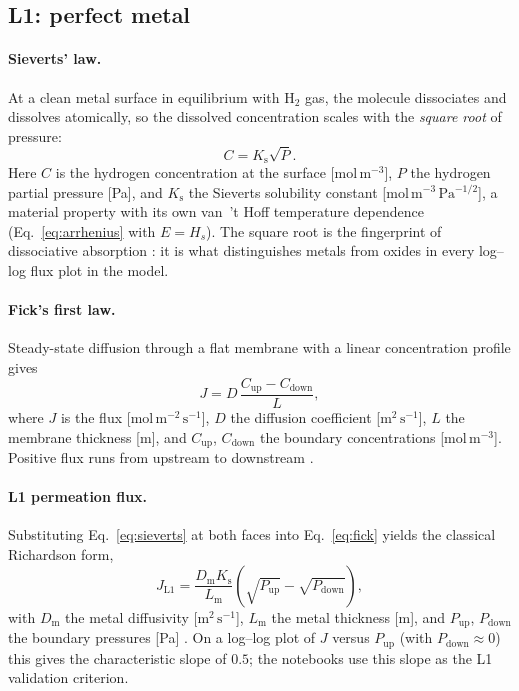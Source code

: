 \documentclass[11pt,a4paper]{article}
\newcommand{\Pup}{P_{\mathrm{up}}}
\newcommand{\Pdown}{P_{\mathrm{down}}}
\newcommand{\Ks}{K_{\mathrm{s}}}
\newcommand{\Dm}{D_{\mathrm{m}}}
\newcommand{\Lm}{L_{\mathrm{m}}}
\begin{document}
\subsection{L1: perfect metal}

\paragraph{Sieverts' law.} At a clean metal surface in equilibrium with
$\mathrm{H_2}$ gas, the molecule dissociates and dissolves atomically, so the
dissolved concentration scales with the \emph{square root} of pressure:
\begin{equation}
  C = \Ks \sqrt{P}.
  \label{eq:sieverts}
\end{equation}
Here $C$ is the hydrogen concentration at the surface
[$\mathrm{mol\,m^{-3}}$], $P$ the hydrogen partial pressure [Pa], and $\Ks$
the Sieverts solubility constant [$\mathrm{mol\,m^{-3}\,Pa^{-1/2}}$], a
material property with its own van~'t Hoff temperature dependence
(Eq.~\eqref{eq:arrhenius} with $E = H_s$). The square root is the fingerprint
of dissociative absorption \citep{sieverts1929}: it is what distinguishes
metals from oxides in every log--log flux plot in the model.

\paragraph{Fick's first law.} Steady-state diffusion through a flat membrane
with a linear concentration profile gives
\begin{equation}
  J = D\,\frac{C_{\mathrm{up}} - C_{\mathrm{down}}}{L},
  \label{eq:fick}
\end{equation}
where $J$ is the flux [$\mathrm{mol\,m^{-2}\,s^{-1}}$], $D$ the diffusion
coefficient [$\mathrm{m^2\,s^{-1}}$], $L$ the membrane thickness [m], and
$C_{\mathrm{up}}$, $C_{\mathrm{down}}$ the boundary concentrations
[$\mathrm{mol\,m^{-3}}$]. Positive flux runs from upstream to downstream
\citep{fick1855}.

\paragraph{L1 permeation flux.} Substituting Eq.~\eqref{eq:sieverts} at both
faces into Eq.~\eqref{eq:fick} yields the classical Richardson form,
\begin{equation}
  J_{\mathrm{L1}} = \frac{\Dm \Ks}{\Lm}\left(\sqrt{\Pup} - \sqrt{\Pdown}\right),
  \label{eq:L1flux}
\end{equation}
with $\Dm$ the metal diffusivity [$\mathrm{m^2\,s^{-1}}$], $\Lm$ the metal
thickness [m], and $\Pup$, $\Pdown$ the boundary pressures [Pa]
\citep{richardson1904,sieverts1929}. On a log--log
plot of $J$ versus $\Pup$ (with $\Pdown \approx 0$) this gives the
characteristic slope of $0.5$; the notebooks use this slope as the L1
validation criterion.
\end{document}
